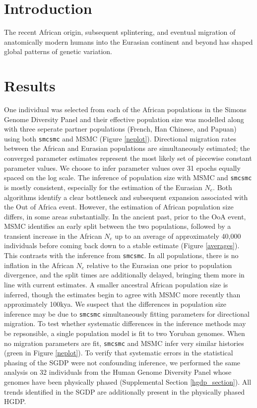 \documentclass{article}
\begin{document}
\newpage

\maketitle

\section{Introduction}
The recent African origin, subsequent splintering, and eventual migration of anatomically modern humans into the Eurasian continent and beyond has shaped global patterns of genetic variation.

\section{Results}

One individual was selected from each of the African populations in the Simons Genome Diversity Panel and their effective population size was modelled along with three seperate partner populations (French, Han Chinese, and Papuan) using both {\tt smcsmc} and MSMC (Figure \ref{neplot}). Directional migration rates between the African and Eurasian populations are simultaneously estimated; the converged parameter estimates represent the most likely set of piecewise constant parameter values. We choose to infer parameter values over 31 epochs equally spaced on the log scale. The inference of population size with MSMC and {\tt smcsmc} is mostly consistent, especially for the estimation of the Eurasian $N_e$. Both algorithms identify a clear bottleneck and subsequent expansion associated with the Out of Africa event. However, the estimation of African population size differs, in some areas substantially. In the ancient past, prior to the OoA event, MSMC identifies an early split between the two populations, followed by a transient increase in the African $N_e$ up to an average of approximately 40,000 individuals before coming back down to a stable estimate (Figure \ref{averages}). This contrasts with the inference from {\tt smcsmc}. In all populations, there is no inflation in the African $N_e$ relative to the Eurasian one prior to population divergence, and the split times are additionally delayed, bringing them more in line with current estimates. A smaller ancestral African population size is inferred, though the estimates begin to agree with MSMC more recently than approximately 100kya. We suspect that the differences in population size inference may be due to {\tt smcsmc} simultaneously fitting parameters for directional migration. To test whether systematic differences in the inference methods may be repsonsible, a single population model is fit to two Yoruban genomes. When no migration parameters are fit, {\tt smcsmc} and MSMC infer very similar histories (green in Figure \ref{neplot}). To verify that systematic errors in the statistical phasing of the SGDP were not confounding inference, we performed the same analysis on 32 individuals from the Human Genome Diversity Panel whose genomes have been physically phased (Supplemental Section \ref{hgdp_section}). All trends identified in the SGDP are additionally present in the physically phased HGDP.   
\end{document}
